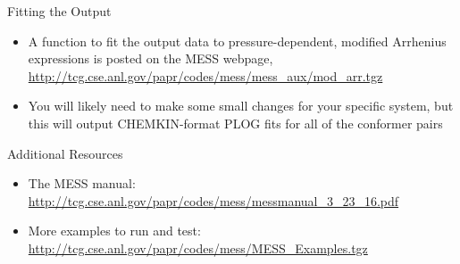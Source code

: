 \documentclass[10pt,presentation]{beamer}
\begin{document}
\begin{frame}{Fitting the Output}
  \begin{itemize}
   \item A function to fit the output data to pressure-dependent, modified Arrhenius expressions is posted on the \textsc{MESS} webpage, \url{http://tcg.cse.anl.gov/papr/codes/mess/mess_aux/mod_arr.tgz}
   \item You will likely need to make some small changes for your specific system, but this will output \textsc{CHEMKIN}-format \textsc{PLOG} fits for all of the conformer pairs
  \end{itemize}
\end{frame}

\begin{frame}{Additional Resources}
  \begin{itemize}
   \item The \textsc{MESS} manual: \url{http://tcg.cse.anl.gov/papr/codes/mess/messmanual_3_23_16.pdf}
   \item More examples to run and test: \url{http://tcg.cse.anl.gov/papr/codes/mess/MESS_Examples.tgz}
  \end{itemize}
\end{frame}
\end{document}
